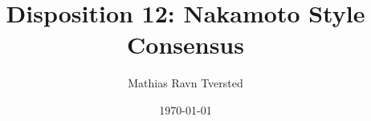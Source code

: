 
\title{Disposition 12: Nakamoto Style Consensus}   
\author{Mathias Ravn Tversted} 
\date{\today} 




\frame{\titlepage} 








